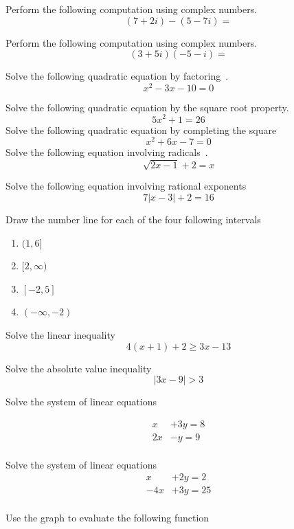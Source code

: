 \documentclass[addpoints,12pt]{exam}
\begin{document}
\begin{questions}
\question Perform the following computation using complex numbers. 
   \[
		 (7+2i)-(5-7i)= 
\]



\question Perform the following computation using complex numbers. 
\[
		 (3+5i)(-5-i)=
\]

\question Solve the following quadratic equation by factoring~. 
\[
	x^{2}-3x-10=0 
\]

\question Solve the following quadratic equation by the square root property. 
   \[
5x^{2}+1=26
\]
\question Solve the following quadratic equation by completing the square 
   \[
x^{2}+6x-7=0
\]
\question Solve the following equation involving radicals~.
   \[
    \sqrt{2x-1}+2=x
	 \]

	 \question Solve the following equation involving rational exponents 
	    \[
	  7|x-3|+2=16
	 \]

\question Draw the number line for each of the four following intervals 
\begin{enumerate}

	\item $(1,6]$
	\item $[2,\infty)$
	\item $[-2,5]$
	\item $(-\infty,-2)$

\end{enumerate}

\question Solve the linear inequality
   \[
4(x+1)+2\geq 3x-13
\]

\question Solve the absolute value inequality 
\[
|3x-9| > 3
\]

\question Solve the system of linear equations

\begin{align*}
	x&+3y=8\\
	2x&-y=9\\
\end{align*}

\question Solve the system of linear equations 
\begin{align*}
	x&+2y=2 \\
		-4x&+3y = 25 \\
\end{align*}


\question Use the graph to evaluate the following function


\end{questions}
\end{document}
